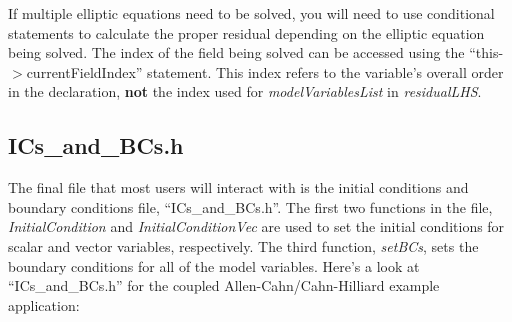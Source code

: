\documentclass[10pt]{article} %
\begin{document}
If multiple elliptic equations need to be solved, you will need to use conditional statements to calculate the proper residual depending on the elliptic equation being solved. The index of the field being solved can be accessed using the ``this-$>$currentFieldIndex'' statement. This index refers to the variable's overall order in the declaration, \textbf{not} the index used for \emph{modelVariablesList} in \emph{residualLHS}.

\subsection{ICs\_and\_BCs.h} \label{icsandbcs}
The final file that most users will interact with is the initial conditions and boundary conditions file, ``ICs\_and\_BCs.h''. The first two functions in the file, \emph{InitialCondition} and \emph{InitialConditionVec} are used to set the initial conditions for scalar and vector variables, respectively. The third function, \emph{setBCs}, sets the boundary conditions for all of the model variables. Here's a look at ``ICs\_and\_BCs.h'' for the coupled Allen-Cahn/Cahn-Hilliard example application:
\tiny
\end{document}
